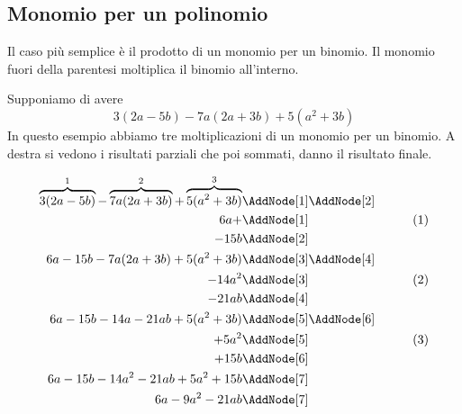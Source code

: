 \subsection{Monomio per un polinomio}
Il caso più semplice è il prodotto di un monomio per un binomio. Il monomio fuori della parentesi moltiplica il binomio all'interno.
\begin{center}

\end{center}
\begin{esempio}
Supponiamo di avere \[3(2a-5b)-7a(2a+3b)+5(a^2+3b)\]
In questo esempio abbiamo tre moltiplicazioni di un monomio per un binomio. A destra si vedono i risultati parziali  che poi sommati, danno il risultato finale.
\begin{NodesList}
	\begin{align*}
		\overbrace{3(2a-5b)}^{1}-\overbrace{7a(2a+3b)}^{2}+\overbrace{5(a^2+3b)}^{3}&\AddNode[1]\AddNode[2]\\
		6a+&\AddNode[1]&\tag{1}\\ 
		-15b&\AddNode[2]&\\
		6a-15b-7a(2a+3b)+5(a^2+3b)&\AddNode[3]\AddNode[4]\\
		-14a^2&\AddNode[3]&\tag{2}\\    
		-21ab&\AddNode[4]&\\
		6a-15b-14a-21ab+5(a^2+3b)&\nonumber\AddNode[5]\AddNode[6]\\
		+5a^2&\AddNode[5]&\tag{3}\\
		+15b&\AddNode[6]&\\
		6a-15b-14a^2-21ab+5a^2+15b&\nonumber\AddNode[7]&\\   
		6a-9a^2-21ab&\nonumber\AddNode[7] 
	\end{align*}
\end{NodesList}
\end{esempio}
\newpage
